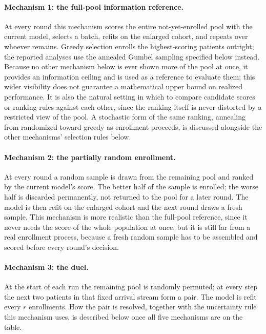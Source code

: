 \paragraph{Mechanism 1: the full-pool information reference.}
At every round this mechanism scores the entire not-yet-enrolled pool with the current
model, selects a batch, refits on the enlarged cohort, and repeats over whoever remains.
Greedy selection enrolls the highest-scoring patients outright; the reported analyses use
the annealed Gumbel sampling specified below instead.
Because no other mechanism below is ever shown more of the pool at once, it provides an
information ceiling and is used as a reference to evaluate them; this wider visibility
does not guarantee a mathematical upper bound on realized performance. It is also
the natural setting in which to compare candidate scores or ranking rules against each
other, since the ranking itself is never distorted by a restricted view of the pool. A
stochastic form of the same ranking, annealing from randomized toward greedy as
enrollment proceeds, is discussed alongside the other mechanisms' selection rules
below.

\paragraph{Mechanism 2: the partially random enrollment.}
At every round a random sample is drawn from the remaining pool and ranked by the
current model's score. The better half of the sample is enrolled; the worse half is
discarded permanently, not returned to the pool for a later round. The model is then
refit on the enlarged cohort and the next round draws a fresh sample. This mechanism is
more realistic than the full-pool reference, since it never needs the score of the whole
population at once, but it is still far from a real enrollment process, because a fresh
random sample has to be assembled and scored before every round's decision.

\paragraph{Mechanism 3: the duel.}
At the start of each run the remaining pool is randomly permuted; at every step the next
two patients in that fixed arrival stream form a pair. The model is refit every
$r$ enrollments. How the pair is resolved, together with the uncertainty rule this
mechanism uses, is described below once all five mechanisms are on the table.

